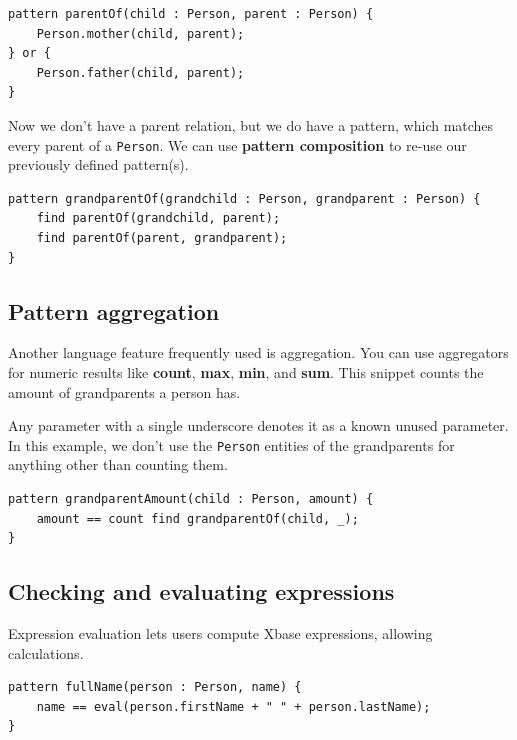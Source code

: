 \documentclass[11pt,a4paper,oneside]{report}
\begin{document}
\begin{lstlisting}[caption={Parent-child relation, using pattern dijunction}, frame=single]
pattern parentOf(child : Person, parent : Person) {
    Person.mother(child, parent);
} or {
    Person.father(child, parent);
}
\end{lstlisting}

Now we don't have a parent relation, but we do have a pattern, which matches
every parent of a \texttt{Person}. We can use \textbf{pattern composition} to
re-use our previously defined pattern(s).

\begin{lstlisting}[caption={Grandparent-grandchild relation, using pattern composition}, frame=single]
pattern grandparentOf(grandchild : Person, grandparent : Person) {
    find parentOf(grandchild, parent);
    find parentOf(parent, grandparent);
}
\end{lstlisting}

\subsection{Pattern aggregation}
Another language feature frequently used is aggregation. You can use
aggregators for numeric results like \textbf{count}, \textbf{max}, \textbf{min},
and \textbf{sum}. This snippet counts the amount of grandparents a person has.

Any parameter with a single underscore denotes it as a known unused parameter.
In this example, we don't use the \texttt{Person} entities of the grandparents
for anything other than counting them.

\pagebreak
\begin{lstlisting}[caption={Counting grandparents using pattern aggregation}, frame=single]
pattern grandparentAmount(child : Person, amount) {
    amount == count find grandparentOf(child, _);
}
\end{lstlisting}

\subsection{Checking and evaluating expressions}
Expression evaluation lets users compute Xbase expressions, allowing calculations.

\begin{lstlisting}[caption={Calculating a \texttt{Person}'s full name using expression evaluation}, frame=single]
pattern fullName(person : Person, name) {
    name == eval(person.firstName + " " + person.lastName);
}
\end{lstlisting}
\end{document}
